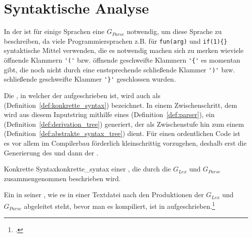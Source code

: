 \section{Syntaktische Analyse}
In der  ist für einige Sprachen eine  $G_{Parse}$ notwendig, um diese Sprache zu beschreiben, da viele Programmiersprachen z.B. für  \verb|fun(arg)| und  \verb|if(1){}| syntaktische Mittel verwenden, die es notwendig machen sich zu merken wieviele öffnende Klammern \verb|'('| bzw. öffnende geschweifte Klammern \verb|'{'| es momentan gibt, die noch nicht durch eine enstsprechende schließende Klammer \verb|')'| bzw. schließende geschweifte Klammer \verb|'}'| geschlossen wurden.


Die , in welcher der  aufgeschrieben ist, wird auch als  (Definition~\ref{def:konkrette_syntax}) bezeichnet. In einem Zwischenschritt, dem  wird aus diesem Inputstring mithilfe eines  (Definition~\ref{def:parser}), ein  (Definition~\ref{def:derivation_tree}) generiert, der als Zwischenstufe hin zum einem  (Definition~\ref{def:abstrakte_syntax_tree}) dient. Für einen ordentlichen Code ist es vor allem im Compilerbau förderlich kleinschrittig vorzugehen, deshalb erst die Generierung des  und dann der .

\begin{Definition}{Konkrette Syntax}{konkrette_syntax}
   einer , die durch die  $G_{Lex}$ und $G_{Parse}$ zusammengenommen beschrieben wird.

  Ein  in seiner , wie es in einer Textdatei nach den Produktionen der  $G_{Lex}$ und $G_{Parse}$ abgeleitet steht, bevor man es kompiliert, ist in  aufgeschrieben.\footcite{noauthor_course_2022}
\end{Definition}

